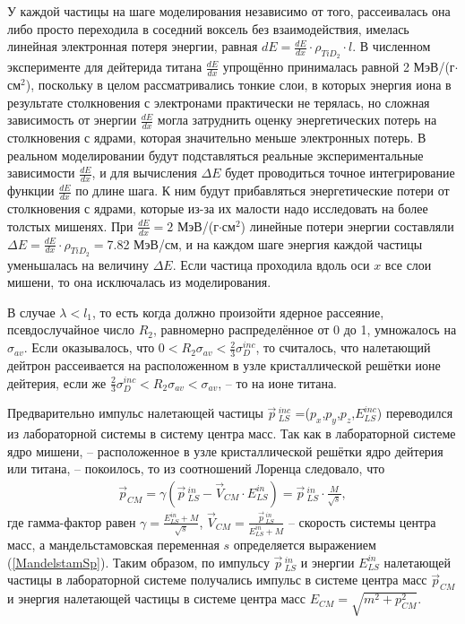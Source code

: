 \documentclass[a4paper,12pt]{article}
\begin{document}
\begin{large}
  У каждой частицы на шаге моделирования независимо от того, рассеивалась она либо просто переходила в соседний воксель без взаимодействия, имелась линейная электронная потеря энергии, равная $dE=\frac{dE}{dx} \cdot \rho_{TiD_2} \cdot l$.
  В численном эксперименте для дейтерида титана $\frac{dE}{dx}$ упрощённо принималась равной 2 МэВ/(г$\cdot$см$^2$), поскольку в целом рассматривались тонкие слои, в которых энергия иона в результате столкновения с электронами практически не терялась, но сложная зависимость от энергии $\frac{dE}{dx}$ могла затруднить оценку энергетических потерь на столкновения с ядрами, которая значительно меньше электронных потерь.
  В реальном моделировании будут подставляться реальные экспериментальные зависимости $\frac{dE}{dx}$, и для вычисления $\Delta E$ будет проводиться точное интегрирование функции $\frac{dE}{dx}$ по длине шага.
  К ним будут прибавляться энергетические потери от столкновения с ядрами, которые из-за их малости надо исследовать на более толстых мишенях.
  При $\frac{dE}{dx}=2$ МэВ/(г$\cdot$см$^2$) линейные потери энергии составляли $\Delta E=\frac{dE}{dx} \cdot \rho_{TiD_2}=$7.82 МэВ/см, и на каждом шаге энергия каждой частицы уменьшалась на величину $\Delta E$.
  Если частица проходила вдоль оси $x$ все слои мишени, то она исключалась из моделирования.

  В случае $\lambda<l_1$, то есть когда должно произойти ядерное рассеяние, псевдослучайное число $R_2$, равномерно распределённое от 0 до 1, умножалось на $\sigma_{av}$.
  Если оказывалось, что $0<R_2\sigma_{av}<\frac{2}{3}\sigma_D^{inc}$, то считалось, что налетающий дейтрон рассеивается на расположенном в узле кристаллической решётки ионе дейтерия, если же $\frac{2}{3}\sigma_D^{inc}<R_2\sigma_{av}<\sigma_{av}$, -- то на ионе титана.

  Предварительно импульс налетающей частицы $\vec{p}\,_{LS}^{inc}$ =($p_x$,$p_y$,$p_z$,$E_{LS}^{inc}$) переводился из лабораторной системы в систему центра масс.
  Так как в лабораторной системе ядро мишени, -- расположенное в узле кристаллической решётки ядро дейтерия или титана, -- покоилось, то из соотношений Лоренца следовало, что
\begin{equation}
\label{MSPlscm}
\begin{aligned} 
\vec{p}_{CM} = \gamma \left( \vec{p}\,_{LS}^{in} - \vec{V}_{CM} \cdot E_{LS}^{in} \right) = \vec{p}\, _{LS}^{in} \cdot \frac{M}{\sqrt{s}},
\end{aligned}
\end{equation}
где гамма-фактор равен $\gamma=\frac{E_{LS}^{in}+M}{\sqrt{s}}$, $\vec{V}_{CM} = \frac{\vec{p}\,_{LS}^{in}}{E_{LS}^{in}+M}$ -- скорость системы центра масс, а мандельстамовская переменная $s$ определяется выражением (\ref{MandelstamSp}).
  Таким образом, по импульсу $\vec{p}\,_{LS}^{in}$ и энергии $E_{LS}^{in}$ налетающей частицы в лабораторной системе получались импульс в системе центра масс $\vec{p}_{CM}$ и энергия налетающей частицы в системе центра масс $E_{CM}=\sqrt{m^2+p_{CM}^2}$.


\end{large}
\end{document}
